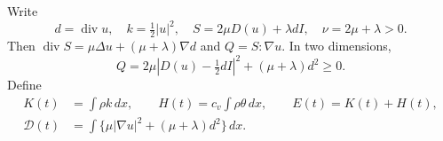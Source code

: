 \documentclass[10pt,twoside]{article}
\newcommand{\dd}{\,dx}
\newcommand{\Div}{\operatorname{div}}
\begin{document}
Write
\begin{equation}\label{eq:notation-stress}
 d=\Div u,\quad k=\tfrac12|u|^2,\quad
 S=2\mu D(u)+\lambda dI,\quad \nu=2\mu+\lambda>0.
\end{equation}
Then $\Div S=\mu\Delta u+(\mu+\lambda)\nabla d$ and $Q=S:\nabla u$.
In two dimensions,
\begin{equation}\label{eq:Q-positive}
 Q=2\mu\left|D(u)-\tfrac12dI\right|^2+(\mu+\lambda)d^2\ge0.
\end{equation}
Define
\begin{align}
 K(t)&=\int\rho k\dd,\qquad H(t)=c_v\int\rho\theta\dd,\qquad
 E(t)=K(t)+H(t),\label{eq:energy-quantities}\\
 \mathcal D(t)&=\int\{\mu|\nabla u|^2+(\mu+\lambda)d^2\}\dd.
 \label{eq:dissipation}
\end{align}
\end{document}
